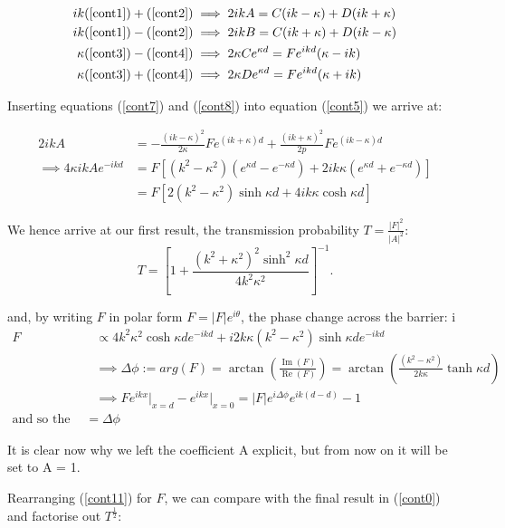 \documentclass{article}
\begin{document}
\begin{align}
	ik(\ref{cont1})+(\ref{cont2}) &\implies 2ikA = C(ik-\kappa)+D(ik+\kappa) \label{cont5}\\
	ik(\ref{cont1})-(\ref{cont2}) &\implies 2ikB = C(ik+\kappa)+D(ik-\kappa) \label{cont6}\\
	\kappa(\ref{cont3})-(\ref{cont4}) &\implies 2\kappa Ce^{\kappa d} = Fe^{ikd}(\kappa-ik) \label{cont7}\\
	\kappa(\ref{cont3})+(\ref{cont4}) &\implies 2\kappa De^{\kappa d} = Fe^{ikd}(\kappa+ik) \label{cont8}
\end{align}

Inserting equations (\ref{cont7}) and (\ref{cont8}) into equation (\ref{cont5}) we arrive at:

\begin{align}
	2ikA &= -\frac{(ik-\kappa)^2}{2\kappa}Fe^{(ik+\kappa)d}+\frac{(ik+\kappa)^2}{2p}Fe^{(ik-\kappa)d} \label{cont9} \\
	\implies 4\kappa ikAe^{-ikd} &= F[(k^2-\kappa^2)(e^{\kappa d}-e^{-\kappa d})+2ik\kappa(e^{\kappa d}+e^{-\kappa d})] \label{cont10}\\
				     &= F[2(k^2-\kappa^2)\sinh{\kappa d}+4ik\kappa \cosh{\kappa d}] \label{cont11}
\end{align}

We hence arrive at our first result, the transmission probability $T = \frac{|F|^2}{|A|^2}$:
\[
	T = [1+\frac{(k^2+\kappa^2)^2\sinh^2{\kappa d}}{4k^2\kappa^2}]^{-1}
.\] 

and, by writing $F$ in polar form $F = |F|e^{i\theta}$, the phase change across the barrier:
i
\begin{align}
	F &\propto 4k^2\kappa^2 \cosh{\kappa d}e^{-ikd}+i2k\kappa(k^2-\kappa^2)\sinh{\kappa d}e^{-ikd} \\
	  &\implies \Delta \phi := arg(F) = \arctan\left(\frac{\operatorname{Im}(F)}{\operatorname{Re}(F)}\right) = \arctan\left(\frac{(k^2-\kappa^2)}{2k\kappa}\tanh{\kappa d}\right) \\
	  &\implies Fe^{ikx}\rvert_{x=d}-e^{ikx}\rvert_{x=0} = |F|e^{i\Delta \phi}e^{ik(d-d)}-1 \\
	  \text{and so the phase change} = \Delta \phi
\end{align}

It is clear now why we left the coefficient A explicit, but from now on it will be set to A = 1.

Rearranging (\ref{cont11}) for $F$, we can compare with the final result in (\ref{cont0}) and factorise out $T^\frac{1}{2}$:
\end{document}
